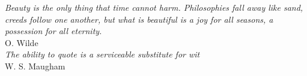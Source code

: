 \cleardoublepage
\thispagestyle{empty}


\vspace*{3cm}

\begin{raggedleft}
    \emph{Beauty is the only thing that time cannot harm. Philosophies fall away like sand, creeds follow one another, but what is beautiful is a joy for all seasons, a possession for all eternity.} \\
    O. Wilde \\
    \vspace{5cm}
    \emph{The ability to quote is a serviceable substitute for wit} \\
    W. S. Maugham \\
\end{raggedleft}

\vspace{4cm}


